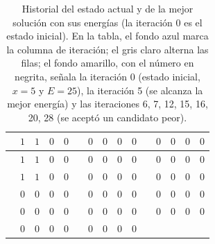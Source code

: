\begin{table}[H]
\begin{tabular}{|c|c|c|c|c|c|c|c|c|c|c|c|c|c|c|}
\hline
\cellcolor{destacado}{\bfseries\boldmath $28$} & \cellcolor{destacado}$1$ & \cellcolor{destacado}$1$ & \cellcolor{destacado}$0$ & \cellcolor{destacado}$0$ & \cellcolor{iteracion}{\bfseries\boldmath $62$} & $0$ & $0$ & $0$ & $0$ & \cellcolor{iteracion}{\bfseries\boldmath $96$} & $0$ & $0$ & $0$ & $0$ \\
\hline
\cellcolor{iteracion}{\bfseries\boldmath $29$} & \cellcolor{cebra}$1$ & \cellcolor{cebra}$1$ & \cellcolor{cebra}$0$ & \cellcolor{cebra}$0$ & \cellcolor{iteracion}{\bfseries\boldmath $63$} & \cellcolor{cebra}$0$ & \cellcolor{cebra}$0$ & \cellcolor{cebra}$0$ & \cellcolor{cebra}$0$ & \cellcolor{iteracion}{\bfseries\boldmath $97$} & \cellcolor{cebra}$0$ & \cellcolor{cebra}$0$ & \cellcolor{cebra}$0$ & \cellcolor{cebra}$0$ \\
\hline
\cellcolor{iteracion}{\bfseries\boldmath $30$} & $1$ & $1$ & $0$ & $0$ & \cellcolor{iteracion}{\bfseries\boldmath $64$} & $0$ & $0$ & $0$ & $0$ & \cellcolor{iteracion}{\bfseries\boldmath $98$} & $0$ & $0$ & $0$ & $0$ \\
\hline
\cellcolor{iteracion}{\bfseries\boldmath $31$} & \cellcolor{cebra}$0$ & \cellcolor{cebra}$0$ & \cellcolor{cebra}$0$ & \cellcolor{cebra}$0$ & \cellcolor{iteracion}{\bfseries\boldmath $65$} & \cellcolor{cebra}$0$ & \cellcolor{cebra}$0$ & \cellcolor{cebra}$0$ & \cellcolor{cebra}$0$ & \cellcolor{iteracion}{\bfseries\boldmath $99$} & \cellcolor{cebra}$0$ & \cellcolor{cebra}$0$ & \cellcolor{cebra}$0$ & \cellcolor{cebra}$0$ \\
\hline
\cellcolor{iteracion}{\bfseries\boldmath $32$} & $0$ & $0$ & $0$ & $0$ & \cellcolor{iteracion}{\bfseries\boldmath $66$} & $0$ & $0$ & $0$ & $0$ & \cellcolor{iteracion}{\bfseries\boldmath $100$} & $0$ & $0$ & $0$ & $0$ \\
\hline
\cellcolor{iteracion}{\bfseries\boldmath $33$} & \cellcolor{cebra}$0$ & \cellcolor{cebra}$0$ & \cellcolor{cebra}$0$ & \cellcolor{cebra}$0$ & \cellcolor{iteracion}{\bfseries\boldmath $67$} & \cellcolor{cebra}$0$ & \cellcolor{cebra}$0$ & \cellcolor{cebra}$0$ & \cellcolor{cebra}$0$ & \cellcolor{cebra} & \cellcolor{cebra} & \cellcolor{cebra} & \cellcolor{cebra} & \cellcolor{cebra} \\
\hline
\end{tabular}
\caption{Historial del estado actual y de la mejor solución con sus energías (la iteración 0 es el estado inicial). En la tabla, el fondo azul marca la columna de iteración; el gris claro alterna las filas; el fondo amarillo, con el número en negrita, señala la iteración 0 (estado inicial, $x=5$ y $E=25$), la iteración 5 (se alcanza la mejor energía) y las iteraciones 6, 7, 12, 15, 16, 20, 28 (se aceptó un candidato peor).}
\label{tab:p3b-energia}
\end{table}
